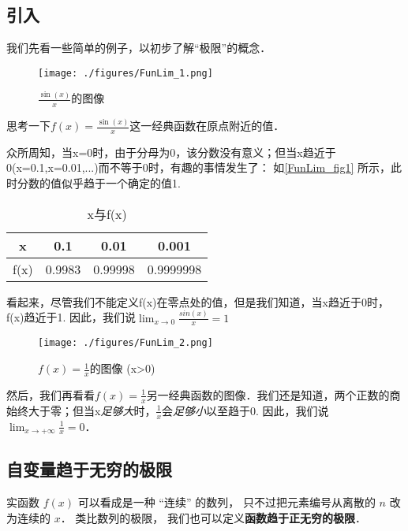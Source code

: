

\subsection{引入}
我们先看一些简单的例子，以初步了解“极限”的概念．
\begin{example}{}\label{FunLim_ex1}
\begin{figure}[ht]
\centering
\texttt{[image: ./figures/FunLim\_1.png]}
\caption{$\frac{\sin(x)}{x}$的图像} \label{FunLim_fig1}
\end{figure}
思考一下$f(x)=\frac{\sin(x)}{x}$这一经典函数在原点附近的值．

众所周知，当x=0时，由于分母为0，该分数没有意义；但当x趋近于0(x=0.1,x=0.01,...)而不等于0时，有趣的事情发生了： 如\autoref{FunLim_fig1} 所示，此时分数的值似乎趋于一个确定的值1.

\begin{table}[ht]
\centering
\caption{x与f(x)}\label{FunLim_tab1}
\begin{tabular}{|c|c|c|c|}
\hline
x & 0.1 & 0.01 & 0.001 \\
\hline
f(x) & 0.9983 & 0.99998 & 0.9999998 \\
\hline
\end{tabular}
\end{table}
看起来，尽管我们不能定义f(x)在零点处的值，但是我们知道，当x趋近于0时，f(x)趋近于1. 因此，我们说$\lim_{x\to0}\frac{sin(x)}{x}=1$
\end{example}

\begin{example}{}
\begin{figure}[ht]
\centering
\texttt{[image: ./figures/FunLim\_2.png]}
\caption{$f(x)=\frac{1}{x}$的图像 (x>0)} \label{FunLim_fig2}
\end{figure}
然后，我们再看看$f(x)=\frac{1}{x}$另一经典函数的图像．我们还是知道，两个正数的商始终大于零；但当x\textsl{足够大}时，$\frac{1}{x}$会\textsl{足够小}以至趋于0. 因此，我们说$\lim_{x\to+\infty}\frac{1}{x}=0$．
\end{example}

\subsection{自变量趋于无穷的极限}
实函数 $f(x)$ 可以看成是一种 “连续” 的数列， 只不过把元素编号从离散的 $n$ 改为连续的 $x$． 类比数列的极限， 我们也可以定义\textbf{函数趋于正无穷的极限}．

